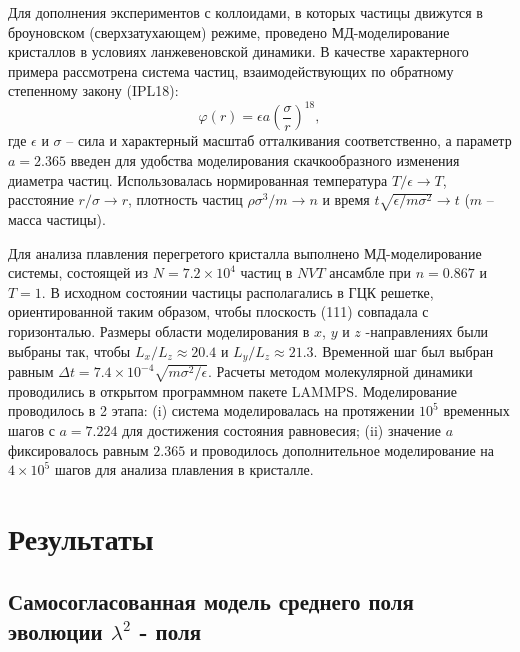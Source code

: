Для дополнения экспериментов с коллоидами, в которых частицы движутся в броуновском (сверхзатухающем) режиме, проведено МД-моделирование кристаллов в условиях ланжевеновской динамики.
В качестве характерного примера рассмотрена система частиц, взаимодействующих по обратному степенному закону (IPL18):
\begin{equation}
\label{SSMF-eq3}
\varphi(r) = \epsilon a \left(\frac{\sigma}{r}\right)^{18},
\end{equation}
где $\epsilon$ и $\sigma$ -- сила и характерный масштаб отталкивания соответственно,
а параметр $ a = 2.365 $ введен для удобства моделирования скачкообразного изменения диаметра частиц.
Использовалась нормированная температура $ T/ \epsilon \rightarrow T $, расстояние $ r/ \sigma \rightarrow r $, плотность частиц $\rho\sigma^3/m\rightarrow n$ и время $t\sqrt{\epsilon/m\sigma^2} \rightarrow t$ ($m$ -- масса частицы).

Для анализа плавления перегретого кристалла выполнено МД-моделирование системы, состоящей из $ N = 7.2 \times 10 ^ 4 $ частиц в $NVT$ ансамбле при $n=0.867$ и $T=1$.
В исходном состоянии частицы располагались в ГЦК решетке, ориентированной таким образом, чтобы плоскость (111) совпадала с горизонталью.
Размеры области моделирования в $ x $, $ y $ и $ z $ -направлениях были выбраны так, чтобы $ L_x / L_z \approx 20.4 $ и $ L_y / L_z \approx 21.3 $.
Временной шаг был выбран равным $ \Delta t = 7.4 \times 10 ^ {- 4} \sqrt {m \sigma ^ 2 / \epsilon} $. Расчеты методом молекулярной динамики проводились в открытом программном пакете LAMMPS.
Моделирование проводилось в 2 этапа: (i) система моделировалась на протяжении $ 10 ^ 5 $ временных шагов с $ a = 7.224 $ для достижения состояния равновесия; (ii) значение $a$ фиксировалось равным $ 2.365 $ и проводилось дополнительное моделирование на $ 4 \times 10 ^ 5 $ шагов для анализа плавления в кристалле.

\section{Результаты}
\subsection{Самосогласованная модель среднего поля эволюции $\lambda^2$ - поля}

